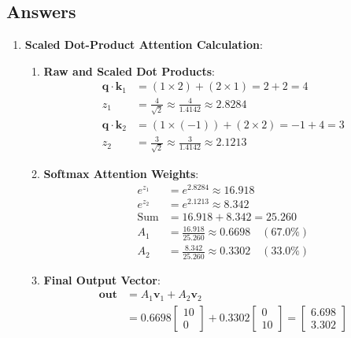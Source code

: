 \subsection*{Answers}\label{subsec:answers}

\begin{enumerate}
    \item \textbf{Scaled Dot-Product Attention Calculation}:
    \begin{enumerate}[label=(\alph*)]
        \item \textbf{Raw and Scaled Dot Products}:
        \begin{align*}
        \mathbf{q} \cdot \mathbf{k}_1 &= (1 \times 2) + (2 \times 1) = 2 + 2 = 4 \\
        z_1 &= \frac{4}{\sqrt{2}} \approx \frac{4}{1.4142} \approx \mathbf{2.8284} \\
        \mathbf{q} \cdot \mathbf{k}_2 &= (1 \times (-1)) + (2 \times 2) = -1 + 4 = 3 \\
        z_2 &= \frac{3}{\sqrt{2}} \approx \frac{3}{1.4142} \approx \mathbf{2.1213}
        \end{align*}

        \item \textbf{Softmax Attention Weights}:
        \begin{align*}
        e^{z_1} &= e^{2.8284} \approx 16.918 \\
        e^{z_2} &= e^{2.1213} \approx 8.342 \\
        \text{Sum} &= 16.918 + 8.342 = 25.260 \\
        A_1 &= \frac{16.918}{25.260} \approx \mathbf{0.6698} \quad (67.0\%) \\
        A_2 &= \frac{8.342}{25.260} \approx \mathbf{0.3302} \quad (33.0\%)
        \end{align*}

        \item \textbf{Final Output Vector}:
        \begin{align*}
        \mathbf{out} &= A_1 \mathbf{v}_1 + A_2 \mathbf{v}_2 \\
                     &= 0.6698 \begin{bmatrix} 10 \\ 0 \end{bmatrix} + 0.3302 \begin{bmatrix} 0 \\ 10 \end{bmatrix} = \begin{bmatrix} \mathbf{6.698} \\ \mathbf{3.302} \end{bmatrix}
        \end{align*}
    \end{enumerate}


\end{enumerate}
